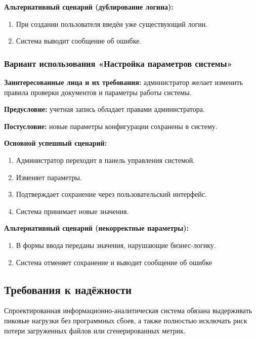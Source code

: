 \textbf{Альтернативный сценарий (дублирование логина):}

\begin{enumerate}
	\item При создании пользователя введён уже существующий логин.
	\item Система выводит сообщение об ошибке.
\end{enumerate}

\subsubsection{Вариант использования «Настройка параметров системы»}

\textbf{Заинтересованные лица и их требования:} администратор желает изменить правила проверки документов и параметры работы системы.

\textbf{Предусловие:} учетная запись обладает правами администратора.

\textbf{Постусловие:} новые параметры конфигурации сохранены в систему.

\textbf{Основной успешный сценарий:}

\begin{enumerate}
	\item Администратор переходит в панель управления системой.
	\item Изменяет параметры.
	\item Подтверждает сохранение через пользовательский интерфейс.
	\item Система принимает новые значения.
\end{enumerate}

\textbf{Альтернативный сценарий (некорректные параметры):}

\begin{enumerate}
	\item В формы ввода переданы значения, нарушающие бизнес-логику.
	\item Система отменяет сохранение и выводит сообщение об ошибке
\end{enumerate}

\subsection{Требования к надёжности}

Спроектированная информационно-аналитическая система обязана выдерживать пиковые нагрузки без программных сбоев, а также полностью исключать риск потери загруженных файлов или сгенерированных метрик.


